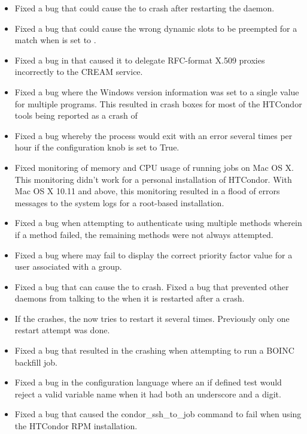 \begin{itemize}
\item Fixed a bug that could cause the  to crash after
restarting the  daemon.

\item Fixed a bug that could cause the wrong dynamic slots to be preempted
for a match when  is set to .

\item Fixed a bug in  that caused it to delegate
RFC-format X.509 proxies incorrectly to the CREAM service.

\item Fixed a bug where the Windows version information was set to
a single value for multiple programs.
This resulted in crash boxes for most of the HTCondor tools being reported
as a crash of 

\item Fixed a bug whereby the  process would exit with
an error several times per hour if the configuration knob 
is set to True.

\item Fixed monitoring of memory and CPU usage of running jobs on Mac OS X.
This monitoring didn't work for a personal installation of HTCondor.
With Mac OS X 10.11 and above, this monitoring resulted in a flood of
errors messages to the system logs for a root-based installation.

\item Fixed a bug when attempting to authenticate using multiple
methods wherein if a method failed, the remaining methods were not
always attempted.

\item Fixed a bug where  may fail to display
the correct priority factor value for a user associated
with a group.

\item Fixed a bug that can cause the  to crash.
Fixed a bug that prevented other daemons from talking to the
 when it is restarted after a crash.

\item If the  crashes, the  now tries to
restart it several times. Previously only one restart attempt was done.

\item Fixed a bug that resulted in the  crashing when
attempting to run a BOINC backfill job.

\item Fixed a bug in the configuration language where an if defined
test would reject a valid variable name when it had both an underscore and a digit.

\item Fixed a bug that caused the condor\_ssh\_to\_job command to fail
when using the HTCondor RPM installation.

\end{itemize}

